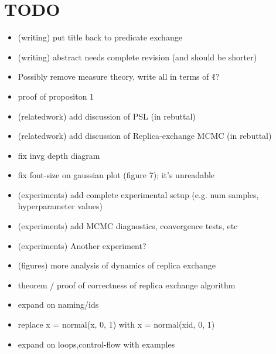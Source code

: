 \section{TODO}
\begin{itemize}
\item (writing) put title back to predicate exchange
\item (writing) abstract needs complete revision (and should be shorter)
\item Possibly remove measure theory, write all in terms of ℓ?
\item proof of propositon 1
\item (relatedwork) add discussion of PSL (in rebuttal)
\item (relatedwork) add discussion of Replica-exchange MCMC (in rebuttal)
\item fix invg depth diagram
\item fix font-size on gaussian plot (figure 7); it's unreadable 
\item (experiments) add complete experimental setup (e.g. num samples, hyperparameter values)
\item (experiments) add MCMC diagnostics, convergence tests, etc
\item (experiments) Another experiment?
\item (figures) more analysis of dynamics of replica exchange
\item theorem / proof of correctness of replica exchange algorithm
\item expand on naming/ids
\item replace x = normal(x, 0, 1) with x = normal(xid, 0, 1)
\item expand on loops,control-flow with examples
\end{itemize}

\newpage